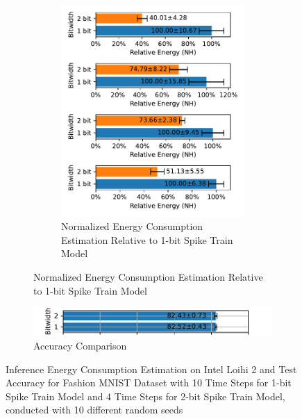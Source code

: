 \begin{figure}[!htpb]
\begin{subfigure}[H]{\textwidth}
\begin{subfigure}[H]{0.49\textwidth}
                    \includegraphics[width=\textwidth]{../timesteps/FashionMNIST/plots/fashionmnist_test_relative_energy_nh.pdf}
                    \caption{Normalized Energy Consumption Estimation Relative to 1-bit Spike Train Model}
                \end{subfigure}
            \end{subfigure}
            \hfill
            \begin{subfigure}[H]{\textwidth}
                \centering
                \includegraphics[width=\textwidth]{../timesteps/FashionMNIST/plots/fashionmnist_final_acc_horizontal.pdf}
                \caption{Accuracy Comparison}
            \end{subfigure}
            \caption{Inference Energy Consumption Estimation on Intel Loihi 2 and Test Accuracy for Fashion MNIST Dataset with 10 Time Steps for 1-bit Spike Train Model and 4 Time Steps for 2-bit Spike Train Model, conducted with 10 different random seeds}
            \label{fig:inference_energy_nh_timesteps}
        \end{figure}
        
